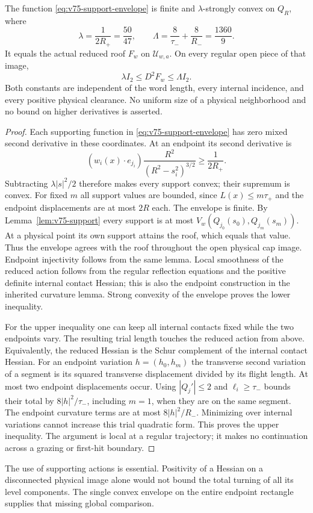 \begin{theorem}
\label{thm:v75-convex-envelope}
The function \eqref{eq:v75-support-envelope} is finite and
$\lambda$-strongly convex on $Q_R$, where
\begin{equation}\label{eq:v75-uniform-curvature}
 \lambda=\frac1{2R_+}=\frac{50}{47},\qquad
 \Lambda=\frac8{\tau_-}+\frac8{R_-}=\frac{1360}{9}.
\end{equation}
It equals the actual reduced roof $F_w$ on $\mathcal U_{w,a}$.
On every regular open piece of that image,
\begin{equation}\label{eq:v75-hessian-sandwich}
                  \lambda I_2\le D^2F_w\le\Lambda I_2.
\end{equation}
Both constants are independent of the word length, every internal
incidence, and every positive physical clearance. No uniform size
of a physical neighborhood and no bound on higher derivatives is
asserted.
\end{theorem}
\begin{proof}
Each supporting function in \eqref{eq:v75-support-envelope} has
zero mixed second derivative in these coordinates. At an endpoint
its second derivative is
\[
  (w_i(x)\cdot e_{j_i})\frac{R^2}{(R^2-s_i^2)^{3/2}}
                                  \ge\frac1{2R_+}.
\]
Subtracting $\lambda|s|^2/2$ therefore makes every support convex;
their supremum is convex. For fixed $m$ all support values are
bounded, since $L(x)\le m\tau_+$ and the endpoint displacements
are at most $2R$ each. The envelope is finite.
By Lemma~\ref{lem:v75-support} every support is at most
$V_w(Q_{j_0}(s_0),Q_{j_m}(s_m))$. At a physical point its own
support attains the roof, which equals that value. Thus the envelope
agrees with the roof throughout the open physical cap image.
Endpoint injectivity follows from the same lemma. Local smoothness
of the reduced action follows from the regular reflection equations
and the positive definite internal contact Hessian; this is also
the endpoint construction in the inherited curvature lemma.
Strong convexity of the envelope proves the lower inequality.

For the upper inequality one can keep all internal contacts fixed
while the two endpoints vary. The resulting trial length touches
the reduced action from above. Equivalently, the reduced Hessian is
the Schur complement of the internal contact Hessian. For an endpoint
variation $h=(h_0,h_m)$ the transverse second variation of a segment
is its squared transverse displacement divided by its flight length.
At most two endpoint displacements occur. Using $|Q_j'|\le2$ and
$\ell_i\ge\tau_-$ bounds their total by $8|h|^2/\tau_-$,
including $m=1$, when they are on the same segment. The endpoint
curvature terms are at most $8|h|^2/R_-$. Minimizing over internal
variations cannot increase this trial quadratic form. This proves
the upper inequality. The argument is local at a regular trajectory;
it makes no continuation across a grazing or first-hit boundary.
\end{proof}

The use of supporting actions is essential. Positivity of a Hessian
on a disconnected physical image alone would not bound the total
turning of all its level components. The single convex envelope on
the entire endpoint rectangle supplies that missing global comparison.
